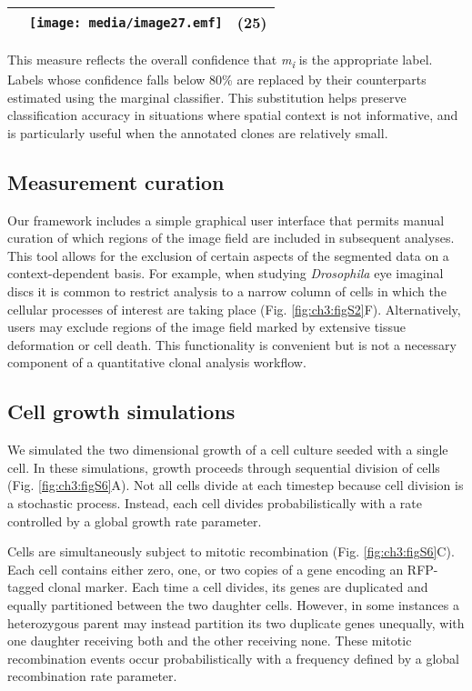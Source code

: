 \begin{longtable}[]{@{}lll@{}}
\toprule
& \texttt{[image: media/image27.emf]} & (25)\tabularnewline
\bottomrule
\end{longtable}

This measure reflects the overall confidence that \emph{m\textsubscript{i}} is the appropriate label. Labels whose confidence falls below 80\% are replaced by their counterparts estimated using the marginal classifier. This substitution helps preserve classification accuracy in situations where spatial context is not informative, and is particularly useful when the annotated clones are relatively small.

\subsection{Measurement curation}

Our framework includes a simple graphical user interface that permits manual curation of which regions of the image field are included in subsequent analyses. This tool allows for the exclusion of certain aspects of the segmented data on a context-dependent basis. For example, when studying \emph{Drosophila} eye imaginal discs it is common to restrict analysis to a narrow column of cells in which the cellular processes of interest are taking place (Fig. \ref{fig:ch3:figS2}F). Alternatively, users may exclude regions of the image field marked by extensive tissue deformation or cell death. This functionality is convenient but is not a necessary component of a quantitative clonal analysis workflow.

\subsection{Cell growth simulations}

We simulated the two dimensional growth of a cell culture seeded with a single cell. In these simulations, growth proceeds through sequential division of cells (Fig. \ref{fig:ch3:figS6}A). Not all cells divide at each timestep because cell division is a stochastic process. Instead, each cell divides probabilistically with a rate controlled by a global growth rate parameter.

Cells are simultaneously subject to mitotic recombination (Fig. \ref{fig:ch3:figS6}C). Each cell contains either zero, one, or two copies of a gene encoding an RFP-tagged clonal marker. Each time a cell divides, its genes are duplicated and equally partitioned between the two daughter cells. However, in some instances a heterozygous parent may instead partition its two duplicate genes unequally, with one daughter receiving both and the other receiving none. These mitotic recombination events occur probabilistically with a frequency defined by a global recombination rate parameter.

